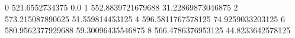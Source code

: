 0 521.6552734375 0.0
1 552.8839721679688 31.22869873046875
2 573.215087890625 51.559814453125
4 596.5811767578125 74.9259033203125
6 580.9562377929688 59.30096435546875
8 566.4786376953125 44.8233642578125
